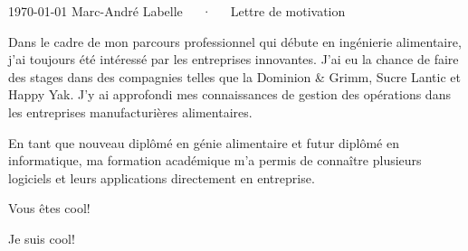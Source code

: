\documentclass[letterpaper]{marckit-cv}
\begin{document}
\makecvheader[C]

\makecvfooter
  {\today}
  {Marc-André Labelle~~~·~~~Lettre de motivation}
  {}

\makelettertitle

\begin{cvletter}

    Dans le cadre de mon parcours professionnel
    qui débute en ingénierie alimentaire, j’ai toujours
    été intéressé par les entreprises innovantes.
    J’ai eu la chance de faire des stages dans des compagnies telles
    que la Dominion \& Grimm, Sucre Lantic et Happy Yak.
    J’y ai approfondi mes connaissances de gestion des
    opérations dans les entreprises manufacturières alimentaires.

    En tant que nouveau diplômé en génie alimentaire
    et futur diplômé en informatique, ma formation académique
    m’a permis de connaître plusieurs logiciels
    et leurs applications directement en entreprise.

    Vous êtes cool!

    Je suis cool!

\end{cvletter}


\makeletterclosing
\end{document}
